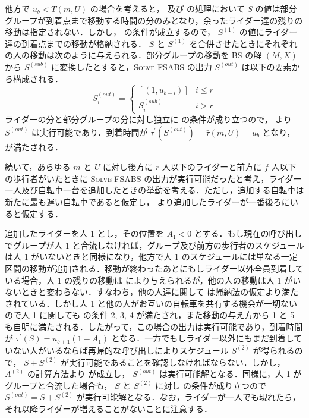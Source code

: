 他方で $u_b < T(m, U)$ の場合を考えると， 及び の処理において $S$ の値は部分グループが到着点まで移動する時間の分のみとなり，余ったライダー達の残りの移動は指定されない．しかし，  の条件が成立するので， $S^{(1)}$ の値にライダー達の到着点までの移動が格納される． $S$ と $S^{(1)}$ を合併させたときにそれぞれの人の移動は次のように与えられる．部分グループの移動を BS の解 $(M, X)$ から $S^{(sub)}$ に変換したとすると，\textsc{Solve-FSABS} の出力 $S^{(out)}$ は以下の要素から構成される．
\begin{equation}
  S^{(out)}_i = \begin{cases}
    [(1, u_{b-i})] & i \leq r \\
    S^{(sub)}_i & i > r
  \end{cases}
\end{equation}
ライダーの分と部分グループの分に対し独立に  の条件が成り立つので，  より $S^{(out)}$ は実行可能であり．到着時間が $\tau^\prime(S^{(out)}) = \bar\tau(m, U) = u_b$ となり，  が満たされる．

続いて，あらゆる $m$ と $U$ に対し後方に $r$ 人以下のライダーと前方に $f$ 人以下の歩行者がいたときに \textsc{Solve-FSABS} の出力が実行可能だったと考え，ライダー一人及び自転車一台を追加したときの挙動を考える．ただし，追加する自転車は新たに最も遅い自転車であると仮定し，  より追加したライダーが一番後ろにいると仮定する．

追加したライダーを人 1 とし，その位置を $A_1 < 0$ とする．もし現在の呼び出しでグループが人 1 と合流しなければ，グループ及び前方の歩行者のスケジュールは人 1 がいないときと同様になり，他方で人 1 のスケジュールには単なる一定区間の移動が追加される．移動が終わったあとにもしライダー以外全員到着している場合，人 1 の残りの移動は  により与えられるが，他の人の移動は人 1 がいないときと変わらない．すなわち，他の人達に関して  は帰納法の仮定より満たされている．しかし人 1 と他の人がお互いの自転車を共有する機会が一切ないので人 1 に関しても  の条件 2, 3, 4 が満たされ，また移動の与え方から 1 と 5 も自明に満たされる．したがって，この場合の出力は実行可能であり，到着時間が $\tau^\prime(S) = u_{b + 1}(1 - A_1)$ となる．一方でもしライダー以外にもまだ到着していない人がいるならば再帰的な呼び出しによりスケジュール $S^{(2)}$ が得られるので， $S + S^{(2)}$ が実行可能であることを確認しなければならない．しかし， $A^{(2)}$ の計算方法より  が成立し， $S^{(out)}$ は実行可能解となる．同様に，人 1 がグループと合流した場合も， $S$ と $S^{(2)}$ に対し  の条件が成り立つので $S^{(out)} = S + S^{(2)}$ が実行可能解となる．なお，ライダーが一人でも現れたら，それ以降ライダーが増えることがないことに注意する．

